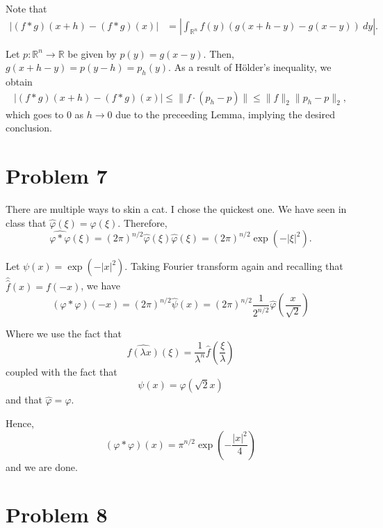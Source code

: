 \documentclass[12pt]{amsart}
\newcommand{\R}{\mathbb{R}}
\newcommand{\wh}[1]{\widehat{#1}}
\begin{document}
Note that 
\begin{align*}
    |(f\ast g)(x + h) - (f\ast g)(x)| &= \left|\int_{\R^n} f(y)\left(g(x + h - y) - g(x - y)\right)~dy\right|.
\end{align*}

Let $p:\R^n\to\R$ be given by $p(y) = g(x - y)$. Then, $g(x + h - y) = p(y - h) = p_h(y)$. As a result of H\"older's inequality, we obtain
\begin{align*}
    |(f\ast g)(x + h) - (f\ast g)(x)|\le\|f\cdot (p_h - p)\|\le\|f\|_2\|p_h - p\|_2,
\end{align*}
which goes to $0$ as $h\to 0$ due to the preceeding Lemma, implying the desired conclusion.

\section*{Problem 7}

There are multiple ways to skin a cat. I chose the quickest one. We have seen in class that $\wh\varphi(\xi) = \varphi(\xi)$. Therefore, 
\begin{equation*}
    \wh{\varphi\ast\varphi}(\xi) = (2\pi)^{n/2}\wh\varphi(\xi)\wh\varphi(\xi) = (2\pi)^{n/2}\exp(-|\xi|^2).
\end{equation*}

Let $\psi(x) = \exp(-|x|^2)$. Taking Fourier transform again and recalling that $\wh{\wh{f}}(x) = f(-x)$, we have 
\begin{equation*}
    (\varphi\ast\varphi)(-x) = (2\pi)^{n/2}\wh\psi(x) = (2\pi)^{n/2}\frac{1}{2^{n/2}}\wh\varphi\left(\frac{x}{\sqrt 2}\right)
\end{equation*}

Where we use the fact that 
\begin{equation*}
    \wh{f(\lambda x)}(\xi) = \frac{1}{\lambda^{n}}\wh f\left(\frac{\xi}{\lambda}\right)
\end{equation*}
coupled with the fact that 
\begin{equation*}
    \psi(x) = \varphi(\sqrt 2 x)
\end{equation*}
and that $\wh\varphi = \varphi$.

Hence, 
\begin{equation*}
    (\varphi\ast\varphi)(x) = \pi^{n/2}\exp\left(-\frac{|x|^2}{4}\right)
\end{equation*}
and we are done.

\section*{Problem 8}
\end{document}
